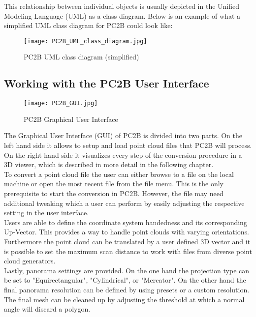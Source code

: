 This relationship between individual objects is usually depicted in the Unified Modeling Language (UML) as a class diagram. Below is an example of what a simplified UML class diagram for PC2B could look like:

\pagebreak

\begin{figure}[h]
	\centering
	\texttt{[image: PC2B\_UML\_class\_diagram.jpg]}
	\caption{PC2B UML class diagram (simplified)}
	\label{fig:pc2b_uml_class_diagram}
\end{figure}

\pagebreak

\subsection{Working with the PC2B User Interface}

\begin{figure}[h]
	\centering
	\texttt{[image: PC2B\_GUI.jpg]}
	\caption{PC2B Graphical User Interface}
	\label{fig:pc2b_gui}
\end{figure}

The Graphical User Interface (GUI) of PC2B is divided into two parts. On the left hand side it allows to setup and load point cloud files that PC2B will process. On the right hand side it visualizes every step of the conversion procedure in a 3D viewer, which is described in more detail in the following chapter.\\

To convert a point cloud file the user can either browse to a file on the local machine or open the most recent file from the file menu. This is the only prerequisite to start the conversion in PC2B. However, the file may need additional tweaking which a user can perform by easily adjusting the respective setting in the user interface.\\

Users are able to define the coordinate system handedness and its corresponding Up-Vector. This provides a way to handle point clouds with varying orientations. Furthermore the point cloud can be translated by a user defined 3D vector and it is possible to set the maximum scan distance to work with files from diverse point cloud generators.\\

Lastly, panorama settings are provided. On the one hand the projection type can be set to "Equirectangular", "Cylindrical", or "Mercator". On the other hand the final panorama resolution can be defined by using presets or a custom resolution. The final mesh can be cleaned up by adjusting the threshold at which a normal angle will discard a polygon.

